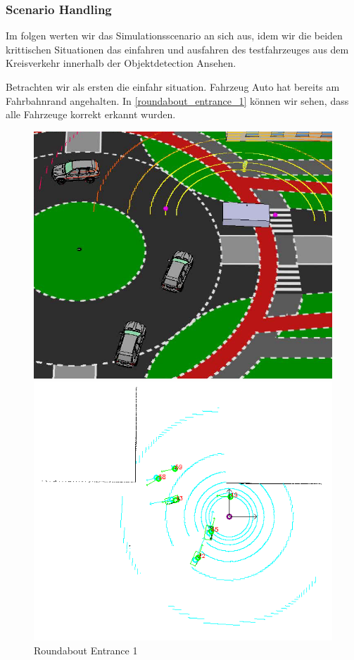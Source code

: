 \documentclass[11pt,oneside,openright]{mpreport}
\begin{document}
\subsubsection{Scenario Handling}
Im folgen werten wir das Simulationsscenario an sich aus, idem wir die beiden krittischen Situationen das einfahren und ausfahren des testfahrzeuges aus dem Kreisverkehr 
innerhalb der Objektdetection Ansehen.

Betrachten wir als ersten die einfahr situation. Fahrzeug Auto hat bereits am Fahrbahnrand angehalten.
In  \cref{roundabout_entrance_1} können wir sehen, dass alle Fahrzeuge korrekt erkannt wurden.


\begin{figure}[htb]
  \caption{Roundabout Entrance 1} 
    \centering
    \begin{minipage}[t]{0.49\textwidth}
        \centering
          \includegraphics[width=\textwidth]{bilder/sim01.png}
    \end{minipage}%
    \hfill
    \begin{minipage}[t]{0.49\textwidth}
        \centering
	\includegraphics[width=\textwidth]{bilder/sim02.png}

\end{minipage}
\end{figure}
\end{document}
